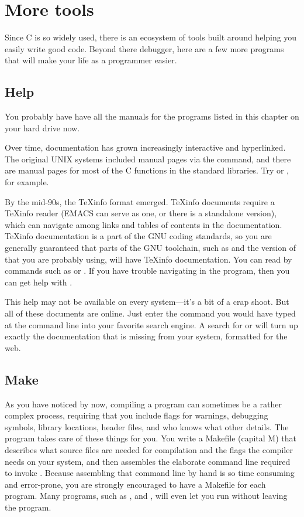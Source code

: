 \section{More tools} 
Since C is so widely used, there is an ecosystem of tools built around
helping you easily write good code.  Beyond there debugger, here are a
few more programs that will make your life as a programmer easier.

\subsection{Help} 
You probably have have all the manuals for the programs listed in this
chapter on your hard drive now. 

Over time, documentation has grown increasingly interactive and
hyperlinked. The original UNIX systems included manual pages via the
 command, and there are manual pages for most of the C functions
in the standard libraries. Try  or ,
for example.

By the mid-90s, the \TeX info format emerged. \TeX info documents
require a \TeX info reader (EMACS can serve as one, or there is a
standalone version), which can navigate among links and tables of
contents in the documentation.
\TeX info documentation is a part of the GNU coding standards, so you
are generally guaranteed that parts of the GNU toolchain, such as
 and the version of  that you are probably using, will
have \TeX info documentation.
You can read by commands such as  or . If
you have trouble navigating in the  program, then you can
get help with .


This help may not be available on every system---it's a bit of
a crap shoot. But all of these documents are online. Just enter the
command you would have typed at the command line into your favorite
search engine. A search for  or  will
turn up exactly the documentation that is missing from your system,
formatted for the web.

\subsection{Make} \label{make} 
As you have noticed by now, compiling a program can sometimes be a
rather complex process, requiring that you include flags for warnings,
debugging symbols, library locations, header files, and who knows what
other details.  The  program takes care of these things for
you. You write a Makefile (capital M) that describes what source files are
needed for compilation and the flags the compiler needs on your system, and then 
 assembles the elaborate command line required to invoke
. Because assembling that command line by hand is so time
consuming and error-prone, you are strongly encouraged to have a Makefile
for each program.  Many programs, such as ,  and
, will even let you run  without leaving the program.

